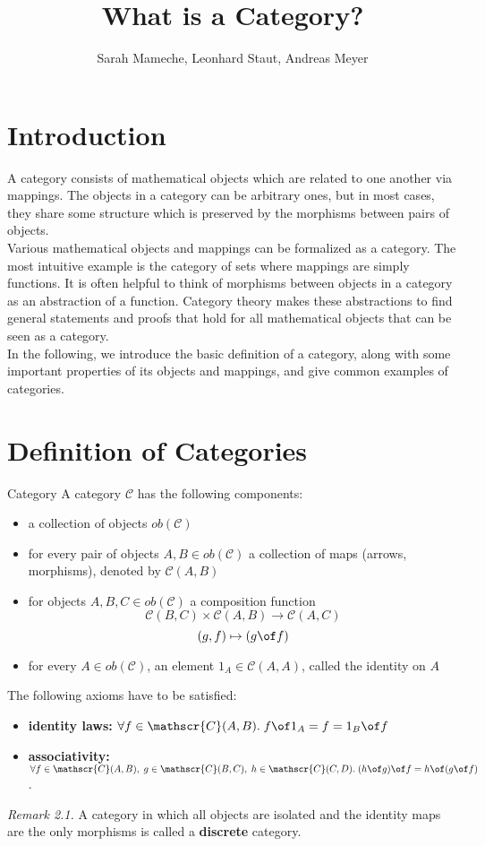 
\def\pathToRoot{../../}

\usepackage{charter}
\selectfont


\title{What is a Category?}
\author{Sarah Mameche, Leonhard Staut, Andreas Meyer}
\maketitle
\section {Introduction}
A category consists of mathematical objects which are related to one another via mappings. The objects in a category can be arbitrary ones, but in most cases, they share some structure which is preserved by the morphisms between pairs of objects.\\ Various mathematical objects and mappings can be formalized as a category. The most intuitive example is the category of sets where mappings are simply functions. It is often helpful to think of morphisms between objects in a category as an abstraction of a function. Category theory makes these abstractions to find general statements and proofs that hold for all mathematical objects that can be seen as a category.
\\ In the following, we introduce the basic definition of a category, along with some important properties of its objects and mappings, and give common examples of categories.
\section {Definition of Categories}
\begin{definition}{Category}
	A category $\mathscr{C}$ has the following components:
	\begin{itemize}
		\item a collection of objects $ob(\mathscr{C})$
		\item for every pair of objects $A, B \in ob(\mathscr{C})$ a collection of maps (arrows, morphisms), denoted by $\mathscr{C}(A, B)$
		\item for objects $A, B, C \in ob(\mathscr{C})$ a composition function
		\[\mathscr{C}(B, C) \times \mathscr{C}(A, B) \rightarrow  \mathscr{C}(A, C)
		\]		\[ (g,f) \mapsto (g \of f)
		\]
		\item for every $A \in ob(\mathscr{C})$, an element $1_A \in \mathscr{C}(A, A)$, called the identity on $A$ 
 	\end{itemize}
 The following axioms have to be satisfied:
 \begin{itemize}
 	\item \textbf{identity laws:} $\forall f \in \mathscr{C}(A, B). \; f \of 1_A = f = 1_B \of f$ 
 	\item \textbf{associativity:} $\forall f \in \mathscr{C}(A, B), \; g \in \mathscr{C}(B, C), \; h \in \mathscr{C}(C, D). \; (h \of g) \of f = h \of (g \of f) $.
 \end{itemize}
\end{definition}
    \textit{Remark 2.1.} A category in which all objects are isolated and the identity maps are the only morphisms is called a \textbf{discrete} category.

